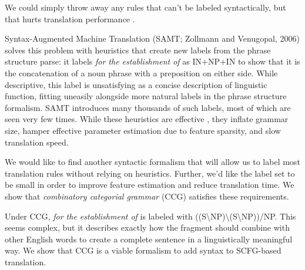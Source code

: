 \documentclass[a4paper]{article}
\begin{document}
We could simply throw away any rules that can't be labeled syntactically, but that hurts translation performance \cite{koehn-och-marcu-2003,deneefe-syntax-and-phrase-mt}.

Syntax-Augmented Machine Translation 
(SAMT; Zollmann and Venugopal, 2006) \nocite{samt-wmt06} %
solves this problem with heuristics that create new labels from the phrase structure parse: it labels {\em for the establishment of} as IN+NP+IN to show that it is the concatenation of a noun phrase with a preposition on either side. While descriptive, this label is unsatisfying as a concise description of linguistic function, fitting uneasily alongside more natural labels in the phrase structure formalism. SAMT introduces many thousands of such labels, most of which are seen very few times. While these heuristics are effective \cite{zollmann+etal:2008:coling}, they inflate grammar size, hamper effective parameter estimation due to feature sparsity, and slow translation speed.

We would like to find another syntactic formalism that will allow us to label most translation rules without relying on heuristics. Further, we'd like the label set to be small in order to improve feature estimation and reduce translation time. We show that {\em combinatory categorial grammar} (CCG) satisfies these requirements.

Under CCG, {\em for the establishment of} is labeled with ((S\textbackslash NP)\textbackslash (S\textbackslash NP))/NP. This seems complex, but it describes exactly how the fragment should combine with other English words to create a complete sentence in a linguistically meaningful way. We show that CCG is a viable  formalism to add syntax to SCFG-based translation.

%
\end{document}
